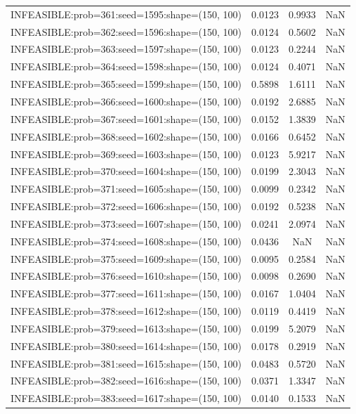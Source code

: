 \begin{longtable}{lccc}
INFEASIBLE:prob=361:seed=1595:shape=(150, 100) & 0.0123 &  0.9933 &    NaN \\
INFEASIBLE:prob=362:seed=1596:shape=(150, 100) & 0.0124 &  0.5602 &    NaN \\
INFEASIBLE:prob=363:seed=1597:shape=(150, 100) & 0.0123 &  0.2244 &    NaN \\
INFEASIBLE:prob=364:seed=1598:shape=(150, 100) & 0.0124 &  0.4071 &    NaN \\
INFEASIBLE:prob=365:seed=1599:shape=(150, 100) & 0.5898 &  1.6111 &    NaN \\
INFEASIBLE:prob=366:seed=1600:shape=(150, 100) & 0.0192 &  2.6885 &    NaN \\
INFEASIBLE:prob=367:seed=1601:shape=(150, 100) & 0.0152 &  1.3839 &    NaN \\
INFEASIBLE:prob=368:seed=1602:shape=(150, 100) & 0.0166 &  0.6452 &    NaN \\
INFEASIBLE:prob=369:seed=1603:shape=(150, 100) & 0.0123 &  5.9217 &    NaN \\
INFEASIBLE:prob=370:seed=1604:shape=(150, 100) & 0.0199 &  2.3043 &    NaN \\
INFEASIBLE:prob=371:seed=1605:shape=(150, 100) & 0.0099 &  0.2342 &    NaN \\
INFEASIBLE:prob=372:seed=1606:shape=(150, 100) & 0.0192 &  0.5238 &    NaN \\
INFEASIBLE:prob=373:seed=1607:shape=(150, 100) & 0.0241 &  2.0974 &    NaN \\
INFEASIBLE:prob=374:seed=1608:shape=(150, 100) & 0.0436 &     NaN &    NaN \\
INFEASIBLE:prob=375:seed=1609:shape=(150, 100) & 0.0095 &  0.2584 &    NaN \\
INFEASIBLE:prob=376:seed=1610:shape=(150, 100) & 0.0098 &  0.2690 &    NaN \\
INFEASIBLE:prob=377:seed=1611:shape=(150, 100) & 0.0167 &  1.0404 &    NaN \\
INFEASIBLE:prob=378:seed=1612:shape=(150, 100) & 0.0119 &  0.4419 &    NaN \\
INFEASIBLE:prob=379:seed=1613:shape=(150, 100) & 0.0199 &  5.2079 &    NaN \\
INFEASIBLE:prob=380:seed=1614:shape=(150, 100) & 0.0178 &  0.2919 &    NaN \\
INFEASIBLE:prob=381:seed=1615:shape=(150, 100) & 0.0483 &  0.5720 &    NaN \\
INFEASIBLE:prob=382:seed=1616:shape=(150, 100) & 0.0371 &  1.3347 &    NaN \\
INFEASIBLE:prob=383:seed=1617:shape=(150, 100) & 0.0140 &  0.1533 &    NaN \\

\end{longtable}
